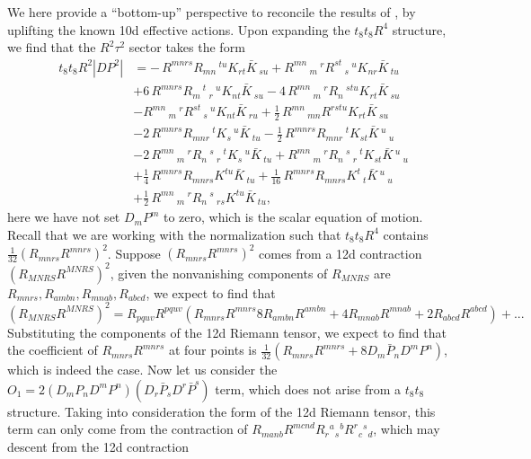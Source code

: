 We here provide a ``bottom-up'' perspective to reconcile the results of \cite{Minasian:2015bxa}, by uplifting the known 10d effective actions. 
Upon expanding the $t_8t_8 R^4$ structure, we find that the $R^2 \tau^2$ sector takes the form
\begin{equation}
\begin{aligned}
t_8 t_8 R^2 |DP^2|
&=-\,R^{m n r s} R_{m n}\,^{t u} K_{r t} \bar{K}\,_{s u}
+R^{m n}\,_{m}\,^{r} R^{s t}\,_{s}\,^{u} K_{n r} \bar{K}\,_{t u}\\
&+6\,R^{m n r s} R_{m}\,^{t}\,_{r}\,^{u} K_{n t} \bar{K}\,_{s u}
-4\,R^{m n}\,_{m}\,^{r} R_{n}\,^{s t u} K_{r t} \bar{K}\,_{s u}\\
&-R^{m n}\,_{m}\,^{r} R^{s t}\,_{s}\,^{u} K_{n t} \bar{K}\,_{r u}
+\frac{1}{2}\,R^{m n}\,_{m n} R^{r s t u} K_{r t} \bar{K}\,_{s u}\\
&-2\,R^{m n r s} R_{m n r}\,^{t} K_{s}\,^{u} \bar{K}\,_{t u}
-\frac{1}{2}\,R^{m n r s} R_{m n r}\,^{t} K_{s t} \bar{K}\,^{u}\,_{u}\\
&-2\,R^{m n}\,_{m}\,^{r} R_{n}\,^{s}\,_{r}\,^{t} K_{s}\,^{u} \bar{K}\,_{t u}
+R^{m n}\,_{m}\,^{r} R_{n}\,^{s}\,_{r}\,^{t} K_{s t} \bar{K}\,^{u}\,_{u}\\
&+\frac{1}{4}\,R^{m n r s} R_{m n r s} K^{t u} \bar{K}\,_{t u}
+\frac{1}{16}\,R^{m n r s} R_{m n r s} K^{t}\,_{t} \bar{K}\,^{u}\,_{u}\\
&+\frac{1}{2}\,R^{m n}\,_{m}\,^{r} R_{n}\,^{s}\,_{r s} K^{t u} \bar{K}\,_{t u},
\end{aligned}
\end{equation}
here we have not set $D_m P^m$ to zero, which is the scalar equation of motion. 
Recall that we are working with the normalization such that $t_8 t_8 R^4$ contains $\frac{1}{32} (R_{mnrs} R^{mnrs})^2$.
Suppose $(R_{mnrs} R^{mnrs})^2$ comes from a 12d contraction $(R_{MNRS}R^{MNRS})^2$, given the nonvanishing components of $R_{MNRS}$ are $R_{mnrs}, R_{ambn}, R_{mnab}, R_{abcd}$, we expect to find that
\begin{equation}
(R_{MNRS}R^{MNRS})^2 = R_{pquv} R^{pquv} (R_{mnrs} R^{mnrs}  8 R_{ambn} R^{ambn} + 4 R_{mnab} R^{mnab} + 2 R_{abcd} R^{abcd}) + ...
\end{equation}
Substituting the components of the 12d Riemann tensor, we expect to find that the coefficient of $R_{mnrs} R^{mnrs}$ at four points is $\frac{1}{32}( R_{mnrs} R^{mnrs} + 8 D_m \bar{P}_n D^m P^n)$, which is indeed the case.
Now let us consider the $O_1 = 2 (D_m P_n D^m P^n)(D_r \bar{P}_s D^r \bar{P}^s)$ term, which does not arise from a $t_8 t_8$ structure. Taking into consideration the form of the 12d Riemann tensor, this term can only come from the contraction of $R_{m a n b} R^{m c n d} R_r{}^{a}{}_{s}{}^{b} R^{r}{}_{c}{}^{s}{}_{d}$, which may descent from the 12d contraction
